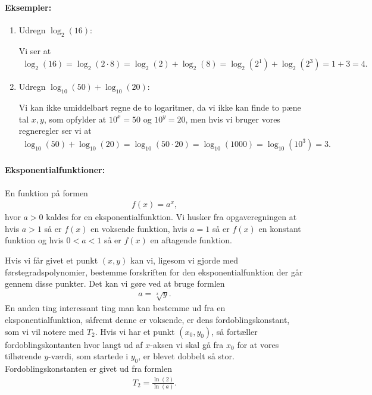 \paragraph*{Eksempler:}
\begin{enumerate}
\item Udregn $\log_2(16)$:

Vi ser at 
\begin{align*}
\log_2(16)=\log_2(2 \cdot 8) = \log_2(2)+\log_2(8) = \log_2(2^1)+ \log_2(2^3) = 1+3 = 4.
\end{align*}
\item Udregn $\log_{10}(50)+\log_{10}(20)$:

Vi kan ikke umiddelbart regne de to logaritmer, da vi ikke kan finde to pæne tal $x,y$, som opfylder at $10^x=50$ og $10^y=20$, men hvis vi bruger vores regneregler ser vi at
\begin{align*}
\log_{10}(50)+\log_{10}(20)=\log_{10}(50 \cdot 20) = \log_{10}(1000)=\log_{10}(10^3)=3.
\end{align*}
\end{enumerate}
\paragraph*{Eksponentialfunktioner:}
En funktion på formen 
\begin{align*}
f(x) = a^x,
\end{align*}
hvor $a >0$ kaldes for en eksponentialfunktion. Vi husker fra opgaveregningen at hvis $a > 1$ så er $f(x)$ en voksende funktion, hvis $a=1$ så er $f(x)$ en konstant funktion og hvis $0<a<1$ så er $f(x)$ en aftagende funktion.

Hvis vi får givet et punkt $(x,y)$ kan vi, ligesom vi gjorde med førstegradspolynomier,  bestemme forskriften for den eksponentialfunktion der går gennem disse punkter. Det kan vi gøre ved at bruge formlen
\begin{align*}
a=\sqrt[x]{y}.
\end{align*}
En anden ting interessant ting man kan bestemme ud fra en eksponentialfunktion, såfremt denne er voksende, er dens fordoblingskonstant, som vi vil notere med $T_2$. Hvis vi har et punkt $(x_0,y_0)$, så fortæller fordoblingskontanten hvor langt ud af $x$-aksen vi skal gå fra $x_0$ for at vores tilhørende $y$-værdi, som startede i $y_0$, er blevet dobbelt så stor. Fordoblingskonstanten er givet ud fra formlen
\begin{align*}
T_2=\frac{\ln(2)}{\ln(a)}.
\end{align*}


